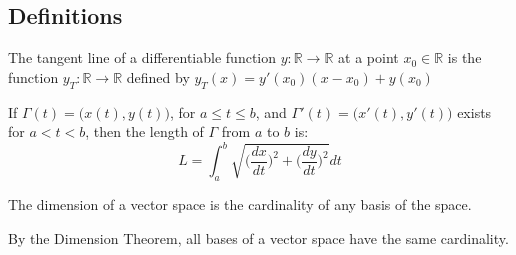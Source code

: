     \subsection{Definitions}
        \begin{definition}
                The tangent line of a differentiable function
                $y:\mathbb{R}\rightarrow\mathbb{R}$ at a point
                $x_{0}\in\mathbb{R}$ is the function
                $y_{T}:\mathbb{R}\rightarrow\mathbb{R}$ defined by
                $y_{T}(x)=y'(x_0)(x-x_0)+y(x_0)$ 
            \end{definition}
        \begin{definition}
            If $\Gamma(t)=\big(x(t),y(t)\big)$, for $a\leq t\leq b$,
            and $\Gamma'(t)=\big(x'(t),y'(t)\big)$ exists for
            $a<t<b$, then the length of $\Gamma$ from $a$ to $b$ is:
            \begin{equation}
                L=\int_{a}^{b}\sqrt{
                    \bigg(\frac{dx}{dt}\bigg)^{2}+
                    \bigg(\frac{dy}{dt}\bigg)^{2}
                }dt
            \end{equation}
        \end{definition}
        \begin{definition}
            The dimension of a vector space is the cardinality of
            any basis of the space. 
        \end{definition}
        By the Dimension Theorem, all bases of a vector space
        have the same cardinality.
